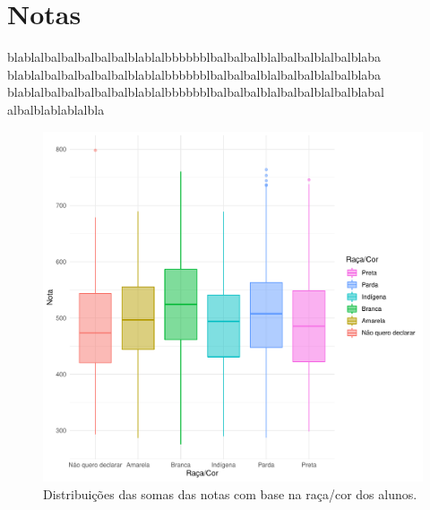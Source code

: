 \newpage
\section{Notas}

blablalbalbalbalbalbalblablalbbbbbblbalbalbalblalbalbalblalbalblaba
blablalbalbalbalbalbalblablalbbbbbblbalbalbalblalbalbalblalbalblaba
blablalbalbalbalbalbalblablalbbbbbblbalbalbalblalbalbalblalbalblabal
albalblablablalbla

\newpage
\begin{figure}[h]
    \caption{Distribuições das somas das notas com base na raça/cor dos alunos.}
    \begin{center}
        \includegraphics[width=16cm]{img/raca_cor_notas.pdf}
    \end{center}
\end{figure}


